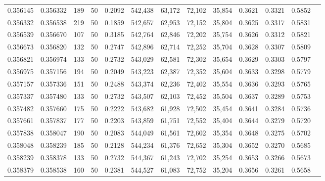 \begin{tabular}{rrrrrrrrrrrrr}
0.356145 & 0.356332 &   189 &  50 &                                     0.2092 & 542,438 &  63,172 &  72,102 &  35,854 & 0.3621 & 0.3321 & 0.5852 \\
0.356332 & 0.356538 &   219 &  50 &                                     0.1859 & 542,657 &  62,953 &  72,152 &  35,804 & 0.3625 & 0.3317 & 0.5831 \\
0.356539 & 0.356670 &   107 &  50 &                                     0.3185 & 542,764 &  62,846 &  72,202 &  35,754 & 0.3626 & 0.3312 & 0.5821 \\
0.356673 & 0.356820 &   132 &  50 &                                     0.2747 & 542,896 &  62,714 &  72,252 &  35,704 & 0.3628 & 0.3307 & 0.5809 \\
0.356821 & 0.356974 &   133 &  50 &                                     0.2732 & 543,029 &  62,581 &  72,302 &  35,654 & 0.3629 & 0.3303 & 0.5797 \\
0.356975 & 0.357156 &   194 &  50 &                                     0.2049 & 543,223 &  62,387 &  72,352 &  35,604 & 0.3633 & 0.3298 & 0.5779 \\
0.357157 & 0.357336 &   151 &  50 &                                     0.2488 & 543,374 &  62,236 &  72,402 &  35,554 & 0.3636 & 0.3293 & 0.5765 \\
0.357337 & 0.357480 &   133 &  50 &                                     0.2732 & 543,507 &  62,103 &  72,452 &  35,504 & 0.3637 & 0.3289 & 0.5753 \\
0.357482 & 0.357660 &   175 &  50 &                                     0.2222 & 543,682 &  61,928 &  72,502 &  35,454 & 0.3641 & 0.3284 & 0.5736 \\
0.357661 & 0.357837 &   177 &  50 &                                     0.2203 & 543,859 &  61,751 &  72,552 &  35,404 & 0.3644 & 0.3279 & 0.5720 \\
0.357838 & 0.358047 &   190 &  50 &                                     0.2083 & 544,049 &  61,561 &  72,602 &  35,354 & 0.3648 & 0.3275 & 0.5702 \\
0.358048 & 0.358239 &   185 &  50 &                                     0.2128 & 544,234 &  61,376 &  72,652 &  35,304 & 0.3652 & 0.3270 & 0.5685 \\
0.358239 & 0.358378 &   133 &  50 &                                     0.2732 & 544,367 &  61,243 &  72,702 &  35,254 & 0.3653 & 0.3266 & 0.5673 \\
0.358379 & 0.358538 &   160 &  50 &                                     0.2381 & 544,527 &  61,083 &  72,752 &  35,204 & 0.3656 & 0.3261 & 0.5658 \\

\end{tabular}
